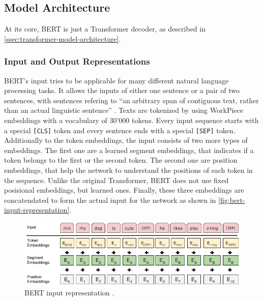 \subsection{Model Architecture}

At its core, BERT is just a Transformer decoder, as described in \autoref{ssec:transformer-model-architecture}.

\subsubsection{Input and Output Representations}

BERT's input tries to be applicable for many different natural language processing tasks.
It allows the inputs of either one sentence or a pair of two sentences, with sentences refering to ``an arbitrary span of contiguous text, rather than an actual linguistic sentence'' \cite[p.~4]{devlin2018bert}.
Texts are tokenized by using WorkPiece embeddings with a vocabulary of 30'000 tokens. %
Every input sequence starts with a special \texttt{[CLS]} token and every sentence ends with a special \texttt{[SEP]} token.
Additionally to the token embeddings, the input consists of two more types of embeddings.
The first one are a learned segment embeddings, that indicates if a token belongs to the first or the second token.
The second one are position embeddings, that help the network to understand the positions of each token in the sequence.
Unlike the original Transformer, BERT does not use fixed posisional embeddings, but learned ones.
Finally, these three embeddings are concatendated to form the actual input for the network as shown in \autoref{fig:bert-input-representation}.

\begin{figure}[h]
\centering
\includegraphics{figures/bert-input-representation}
\caption[BERT input representation]{BERT input representation \cite[p.~5]{devlin2018bert}.}
\label{fig:bert-input-representation}
\end{figure}

